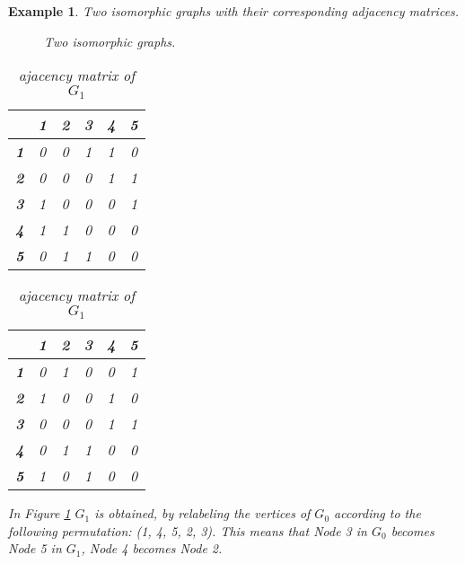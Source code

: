 \documentclass[12pt,a4paper]{article}
\newtheorem{exa}[thm]{Example}
\newcommand{\Authornote}[2]{\noindent{\small\textcolor{DSgray}{\sf{
\textcolor{red}{[#1: #2]\marginpar{\textcolor{red}{\fbox{\Large !}}}}}}}}
\newcommand{\Jnote}{\Authornote{Jan}}
\begin{document}
\begin{exa}
 Two isomorphic graphs with their corresponding adjacency matrices.
\begin{figure}[h!]
	\centering
	\caption{Two isomorphic graphs.}
	\label{fig:Two isomorphic graphs}
\end{figure}
\begin{table}[!htb]
	\begin{minipage}{.5\linewidth}
		
		\centering
		\begin{tabular}{|c|c|c|c|c|c|}
			\hline 
			& \textbf{1} & \textbf{2} & \textbf{3} & \textbf{4} & \textbf{5} \\ 
			\hline 
			\textbf{1} & 0 & 0 & 1 & 1 & 0 \\ 
			\hline 
			\textbf{2} & 0 & 0 & 0 & 1 & 1 \\ 
			\hline 
			\textbf{3} & 1 & 0 & 0 & 0 & 1 \\ 
			\hline 
			\textbf{4} & 1 & 1 & 0 & 0 & 0 \\ 
			\hline 
			\textbf{5} & 0 & 1 & 1 & 0 & 0 \\ 
			\hline  
		\end{tabular} 
	\caption{ajacency matrix of $G_0$}
	\end{minipage}%
	\begin{minipage}{.5\linewidth}
		\centering

		\begin{tabular}{|c|c|c|c|c|c|}
			\hline 
			& \textbf{1} & \textbf{2} & \textbf{3} & \textbf{4} & \textbf{5} \\ 
			\hline 
			\textbf{1} & 0 & 1 & 0 & 0 & 1 \\ 
			\hline 
			\textbf{2} & 1 & 0 & 0 & 1 & 0 \\ 
			\hline 
			\textbf{3} & 0 & 0 & 0 & 1 & 1 \\ 
			\hline 
			\textbf{4} & 0 & 1 & 1 & 0 & 0 \\ 
			\hline 
			\textbf{5} & 1 & 0 & 1 & 0 & 0 \\ 
			\hline 
		\end{tabular}
			\caption{ajacency matrix of $G_1$}
	\end{minipage} 
\end{table}

\Jnote{adjacency}

In Figure \ref{fig:Two isomorphic graphs} $G_1$ is obtained, by relabeling the vertices of $G_0$ according to the following permutation: (1, 4, 5, 2, 3). This means that Node 3 in $G_0$ becomes Node 5 in $G_1$, Node 4 becomes Node 2. 
\end{exa}
\end{document}
